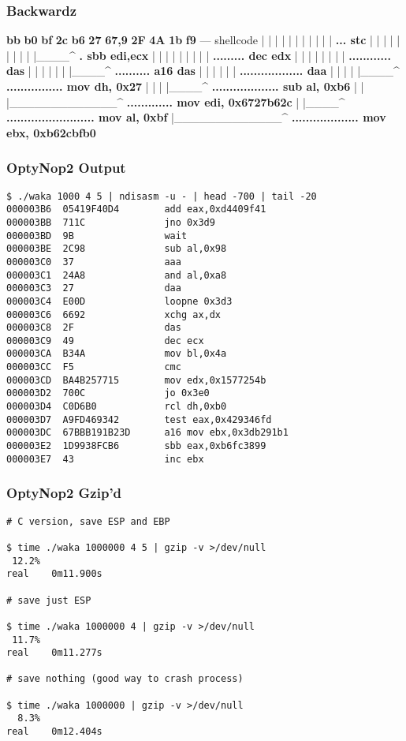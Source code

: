 \documentclass{beamer}
\begin{document}
\begin{frame}[fragile]
  \frametitle{Backwardz}
  {\footnotesize
  \begin{semiverbatim}
  \textbf<11>{bb} \textbf<10,11>{b0} \textbf<9,10,11>{bf} \textbf<8,9,11>{2c} \textbf<7,8,9,11>{b6} \textbf<6,7,9>{27} \textbf<5>{67,9} \textbf<4,5>{2F} \textbf<3>{4A} \textbf<2>{1b} \textbf<1,2>{f9} --- shellcode
  |  |  |  |  |  |  |  |  |  |  | \textbf<1>{... stc}
  |  |  |  |  |  |  |  |  |  |____^ \textbf<2>{. sbb edi,ecx}
  |  |  |  |  |  |  |  |  | \textbf<3>{......... dec edx}
  |  |  |  |  |  |  |  | \textbf<4>{............ das}
  |  |  |  |  |  |  |____^ \textbf<5>{.......... a16 das}
  |  |  |  |  |  | \textbf<6>{.................. daa}
  |  |  |  |  |____^ \textbf<7>{................ mov dh, 0x27}
  |  |  |  |____^ \textbf<8>{................... sub al, 0xb6}
  |  |  |_____________^ \textbf<9>{............. mov edi, 0x6727b62c}
  |  |____^ \textbf<10>{......................... mov al, 0xbf}
  |_____________^ \textbf<11>{................... mov ebx, 0xb62cbfb0}
\end{semiverbatim}
}
\end{frame}

\begin{frame}[fragile]
  \frametitle{OptyNop2 Output}
  {\footnotesize
  \begin{verbatim}
$ ./waka 1000 4 5 | ndisasm -u - | head -700 | tail -20
000003B6  05419F40D4        add eax,0xd4409f41
000003BB  711C              jno 0x3d9
000003BD  9B                wait
000003BE  2C98              sub al,0x98
000003C0  37                aaa
000003C1  24A8              and al,0xa8
000003C3  27                daa
000003C4  E00D              loopne 0x3d3
000003C6  6692              xchg ax,dx
000003C8  2F                das
000003C9  49                dec ecx
000003CA  B34A              mov bl,0x4a
000003CC  F5                cmc
000003CD  BA4B257715        mov edx,0x1577254b
000003D2  700C              jo 0x3e0
000003D4  C0D6B0            rcl dh,0xb0
000003D7  A9FD469342        test eax,0x429346fd
000003DC  67BBB191B23D      a16 mov ebx,0x3db291b1
000003E2  1D9938FCB6        sbb eax,0xb6fc3899
000003E7  43                inc ebx
\end{verbatim}
}
\end{frame}


\begin{frame}[fragile]
  \frametitle{OptyNop2 Gzip'd}
  {\footnotesize
  \begin{verbatim}
# C version, save ESP and EBP

$ time ./waka 1000000 4 5 | gzip -v >/dev/null
 12.2%
real    0m11.900s

# save just ESP

$ time ./waka 1000000 4 | gzip -v >/dev/null
 11.7%
real    0m11.277s

# save nothing (good way to crash process)

$ time ./waka 1000000 | gzip -v >/dev/null
  8.3%
real    0m12.404s
\end{verbatim}
}
\end{frame}
\end{document}

